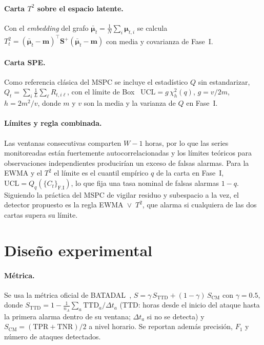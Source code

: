 \documentclass[11pt,a4paper]{article}
\newcommand{\UCL}{\mathrm{UCL}}
\begin{document}
\paragraph{Carta $T^2$ sobre el espacio latente.} Con el \emph{embedding} del grafo
$\bar{\bm\mu}_t=\frac1N\sum_i\bm\mu_{t,i}$ se calcula
$T^2_t=(\bar{\bm\mu}_t-\mathbf m)^\top\mathbf S^{+}(\bar{\bm\mu}_t-\mathbf m)$ con media
y covarianza de Fase~I.

\paragraph{Carta SPE.} Como referencia clásica del MSPC se incluye el estadístico $Q$
sin estandarizar, $Q_t=\sum_i \frac1L\sum_\ell R_{t,i\ell}$, con el límite de
Box~\cite{box1954,nomikos1995} $\UCL=g\,\chi^2_h(q)$, $g=v/2m$, $h=2m^2/v$, donde $m$ y
$v$ son la media y la varianza de $Q$ en Fase~I.

\paragraph{Límites y regla combinada.} Las ventanas consecutivas comparten $W-1$
horas, por lo que las series monitoreadas están fuertemente autocorrelacionadas y los
límites teóricos para observaciones independientes producirían un exceso de falsas
alarmas. Para la EWMA y el $T^2$ el límite es el cuantil empírico $q$ de la carta en
Fase~I, $\UCL=Q_q(\{C_t\}_{\text{F.I}})$, lo que fija una tasa nominal de falsas
alarmas $1-q$. Siguiendo la práctica del MSPC de vigilar residuo y subespacio a la vez,
el detector propuesto es la regla EWMA~$\vee$~$T^2$, que alarma si cualquiera de las
dos cartas supera su límite.

\section{Diseño experimental}
\label{sec:diseno}

\paragraph{Métrica.} Se usa la métrica oficial de BATADAL~\cite{taormina2018},
$S=\gamma\,S_{\mathrm{TTD}}+(1-\gamma)\,S_{\mathrm{CM}}$ con $\gamma=0.5$, donde
$S_{\mathrm{TTD}}=1-\frac1{n_A}\sum_a \mathrm{TTD}_a/\Delta t_a$ (TTD: horas desde el
inicio del ataque hasta la primera alarma dentro de su ventana; $\Delta t_a$ si no se
detecta) y $S_{\mathrm{CM}}=(\mathrm{TPR}+\mathrm{TNR})/2$ a nivel horario. Se reportan
además precisión, $F_1$ y número de ataques detectados.
\end{document}
